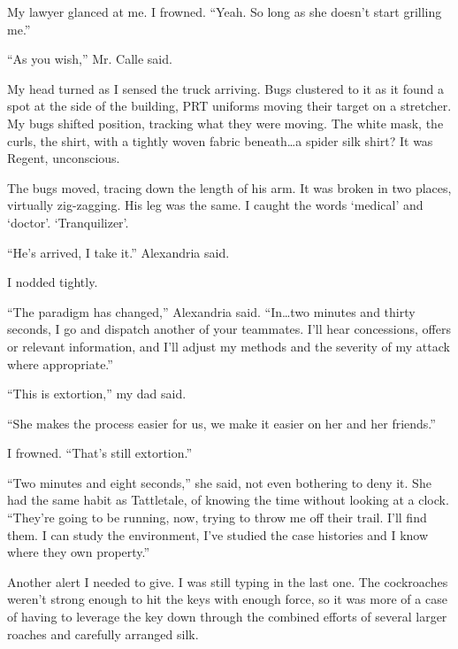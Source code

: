 My lawyer glanced at me.  I frowned.  ``Yeah.  So long as she doesn't start grilling me.''



``As you wish,'' Mr. Calle said.



My head turned as I sensed the truck arriving.   Bugs clustered to it as it found a spot at the side of the building, PRT uniforms moving their target on a stretcher.  My bugs shifted position, tracking what they were moving.  The white mask, the curls, the shirt, with a tightly woven fabric beneath\ldots a spider silk shirt?  It was Regent, unconscious.



The bugs moved, tracing down the length of his arm.  It was broken in two places, virtually zig-zagging.  His leg was the same.  I caught the words `medical' and `doctor'.  `Tranquilizer'.



``He's arrived, I take it.'' Alexandria said.



I nodded tightly.



``The paradigm has changed,'' Alexandria said.  ``In\ldots two minutes and thirty seconds, I go and dispatch another of your teammates.  I'll hear concessions, offers or relevant information, and I'll adjust my methods and the severity of my attack where appropriate.''



``This is extortion,'' my dad said.



``She makes the process easier for us, we make it easier on her and her friends.''



I frowned.  ``That's still extortion.''



``Two minutes and eight seconds,'' she said, not even bothering to deny it.  She had the same habit as Tattletale, of knowing the time without looking at a clock.  ``They're going to be running, now, trying to throw me off their trail.  I'll find them.  I can study the environment, I've studied the case histories and I know where they own property.''



Another alert I needed to give.  I was still typing in the last one.  The cockroaches weren't strong enough to hit the keys with enough force, so it was more of a case of having to leverage the key down through the combined efforts of several larger roaches and carefully arranged silk.



